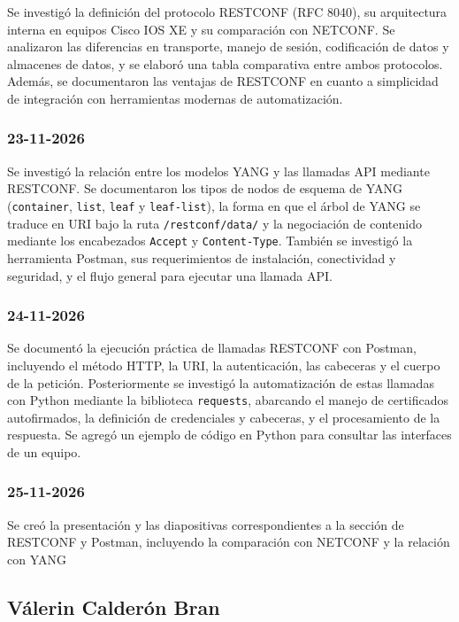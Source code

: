 \documentclass[12pt,a4paper]{article}
\begin{document}
Se investigó la definición del protocolo RESTCONF (RFC 8040), su arquitectura interna en equipos Cisco IOS XE y su comparación con NETCONF. Se analizaron las diferencias en transporte, manejo de sesión, codificación de datos y almacenes de datos, y se elaboró una tabla comparativa entre ambos protocolos. Además, se documentaron las ventajas de RESTCONF en cuanto a simplicidad de integración con herramientas modernas de automatización. 

\subsubsection{23-11-2026}

Se investigó la relación entre los modelos YANG y las llamadas API mediante RESTCONF. Se documentaron los tipos de nodos de esquema de YANG (\texttt{container}, \texttt{list}, \texttt{leaf} y \texttt{leaf-list}), la forma en que el árbol de YANG se traduce en URI bajo la ruta \texttt{/restconf/data/} y la negociación de contenido mediante los encabezados \texttt{Accept} y \texttt{Content-Type}. También se investigó la herramienta Postman, sus requerimientos de instalación, conectividad y seguridad, y el flujo general para ejecutar una llamada API.

\subsubsection{24-11-2026}

Se documentó la ejecución práctica de llamadas RESTCONF con Postman, incluyendo el método HTTP, la URI, la autenticación, las cabeceras y el cuerpo de la petición. Posteriormente se investigó la automatización de estas llamadas con Python mediante la biblioteca \texttt{requests}, abarcando el manejo de certificados autofirmados, la definición de credenciales y cabeceras, y el procesamiento de la respuesta. Se agregó un ejemplo de código en Python para consultar las interfaces de un equipo.

\subsubsection{25-11-2026} 
Se creó la presentación y las diapositivas correspondientes a la sección de RESTCONF y Postman, incluyendo la comparación con NETCONF y la relación con YANG


\subsection{Válerin Calderón Bran}
\end{document}

